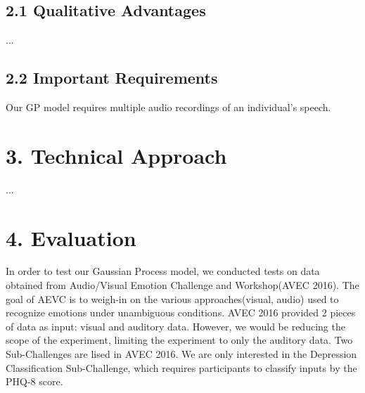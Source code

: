 \documentclass{article}
\begin{document}
	\subsection{2.1 Qualitative Advantages}
	... \\

	\subsection{2.2 Important Requirements}
	 Our GP model requires multiple audio recordings of an individual's speech. \\

	\section{3. Technical Approach}
	... \\	

	\section{4. Evaluation}
	In order to test our Gaussian Process model, we conducted tests on data obtained from Audio/Visual Emotion Challenge and Workshop(AVEC 2016). The goal of AEVC is to weigh-in on the various approaches(visual, audio) used to recognize emotions under unambiguous conditions. AVEC 2016 provided 2 pieces of data as input: visual and auditory data. However, we would be reducing the scope of the experiment, limiting the experiment to only the auditory data. Two Sub-Challenges are lised in AVEC 2016. We are only interested in the Depression Classification Sub-Challenge, which requires participants to classify inputs by the PHQ-8 score.
\end{document}
